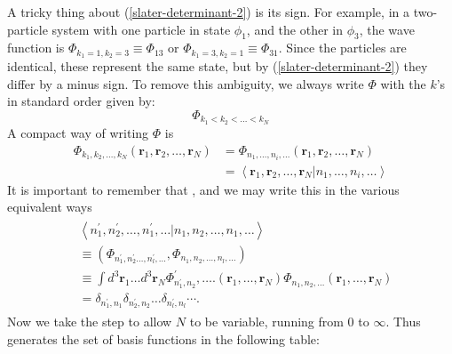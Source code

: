 A tricky thing about (\ref{slater-determinant-2}) is its sign. For example, in a two-particle system with one particle in state $\phi_{1}$, and the other in $\phi_3$, the wave function is $\Phi_{k_1=1,k_2=3}\equiv\Phi_{13}$ or $\Phi_{k_1=3,k_2=1}\equiv\Phi_{31}$. Since the particles are identical, these represent the same state, but by (\ref{slater-determinant-2}) they differ by a minus sign. To remove this ambiguity, we always write $\Phi$ with the $k$'s in standard order given by:
\begin{equation}\Phi_{k_{1}<k_{2}<\ldots<k_{N}}\end{equation}
A compact way of writing $\Phi$ is
\begin{equation}\begin{aligned}
\Phi_{k_{1}, k_{2}, \ldots, k_{N}}\left(\mathbf{r}_{1}, \mathbf{r}_{2}, \ldots, \mathbf{r}_{N}\right) &=\Phi_{n_{1}, \ldots, n_{i}, \ldots}\left(\mathbf{r}_{1}, \mathbf{r}_{2}, \ldots, \mathbf{r}_{N}\right) \\
&=\left\langle\mathbf{r}_{1}, \mathbf{r}_{2}, \dots, \mathbf{r}_{N} | n_{1}, \dots, n_{i}, \dots\right\rangle
\end{aligned}\end{equation}
It is important to remember that , and we may write this in the various equivalent ways
\begin{equation}\begin{array}{l}
\begin{aligned}
&\left\langle n_{1}^{\prime}, n_{2}^{\prime}, \ldots, n_{1}^{\prime}, \ldots | n_{1}, n_{2}, \ldots, n_{1}, \ldots\right\rangle  \\
& \equiv\left(\Phi_{n_{1}^{\prime}, n_{2}^{\prime}\ldots, n_{l}^{\prime}, \ldots} , \Phi_{n_{1}, n_{2}, \ldots, n_{l}, \ldots}\right) \\
& \equiv \int d^{3} \mathbf{r}_{1} \ldots d^{3} \mathbf{r}_{N} \Phi_{n_{1}^{\prime}, n_{2}}^{\prime}, \ldots .\left(\mathbf{r}_{1}, \ldots, \mathbf{r}_{N}\right) \Phi_{n_{1}, n_{2}, \ldots}\left(\mathbf{r}_{1}, \ldots, \mathbf{r}_{N}\right) \\
&=\delta_{n_{1}^{\prime}, n_{1}} \delta_{n_{2}^{\prime}, n_{2}} \ldots \delta_{n_{l}^{\prime}, n_{l}} \cdots .
\end{aligned}
\end{array}\end{equation}
Now we take the step to allow $N$ to be variable, running from 0 to $\infty$. Thus generates the set of basis functions in the following table:
